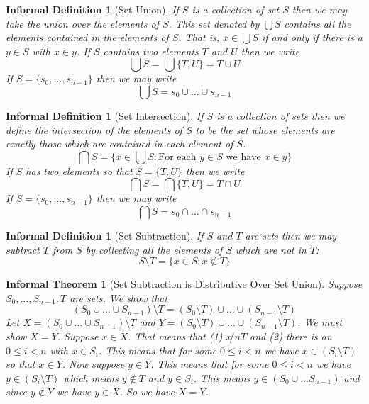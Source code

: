 \documentclass[12pt]{article}
\theoremstyle{break}
\theoremstyle{break}
\theoremstyle{break}
\theoremstyle{break}
\theoremstyle{break}
\newtheorem{informal definition}[definition]{Informal Definition}
\theoremstyle{break}
\newtheorem{informal theorem}[theorem]{Informal Theorem}
\begin{document}
	\begin{informal definition}[Set Union]
		If $S$ is a collection of set $S$ then we may take the union over the elements of $S$.
		This set denoted by $\bigcup S$ contains all the elements contained in the elements of $S$.
		That is, $x \in \bigcup S$ if and only if there is a $y\in S$ with $x\in y$.
		If $S$ contains two elements $T$ and $U$ then we write
		$$
		\bigcup S = \bigcup \{T, U\} = T \cup U
		$$
		If $S = \{s_0, \ldots, s_{n-1}\}$ then we may write
		$$
		\bigcup S = s_0 \cup \ldots \cup s_{n-1}
		$$
	\end{informal definition}
	
	\begin{informal definition}[Set Intersection]
		If $S$ is a collection of sets then we define the intersection of the elements of $S$ to be the set whose elements are exactly those which are contained in each element of $S$.
		$$
		\bigcap S = \{x \in \bigcup S: \text{For each } y \in S \text{ we have } x \in y\}
		$$
		If $S$ has two elements so that $S = \{T, U\}$ then we write
		$$
		\bigcap S = \bigcap \{T, U\} = T \cap U
		$$
		If $S = \{s_0, \ldots, s_{n-1}\}$ then we may write
		$$
		\bigcap S = s_0 \cap \ldots \cap s_{n-1}
		$$
	\end{informal definition}
	
	\begin{informal definition}[Set Subtraction]
		If $S$ and $T$ are sets then we may subtract $T$ from $S$ by collecting all the elements of $S$ which are not in $T$:
		\begin{equation*}
			S\setminus T = \{x \in S: x \not \in T\}
		\end{equation*}
	\end{informal definition}
	
	\begin{informal theorem}[Set Subtraction is Distributive Over Set Union]
		Suppose $S_0, \ldots, S_{n-1}, T$ are sets.
		We show that
		\begin{equation*}
			(S_0 \cup \ldots \cup S_{n-1}) \setminus T = (S_0 \setminus T) \cup \ldots \cup (S_{n-1} \setminus T)
		\end{equation*}
		Let $X = (S_0 \cup \ldots \cup S_{n-1}) \setminus T$ and $Y = (S_0 \setminus T) \cup \ldots \cup (S_{n-1} \setminus T)$.
		We must show $X=Y$.
		Suppose $x \in X$.
		That means that (1) $x\not in T$ and (2) there is an $0 \le i < n$ with $x\in S_i$.
		This means that for some $0 \le i < n$ we have $x\in (S_i \setminus T)$ so that $x\in Y$.
		Now suppose $y\in Y$.
		This means that for some $0 \le i < n$ we have $y\in (S_i \setminus T)$ which means $y \not \in T$ and $y\in S_i$.
		This means $y\in (S_0 \cup \ldots S_{n-1})$ and since $y \not \in Y$ we have $y\in X$.
		So we have $X = Y$.
	\end{informal theorem}
	
\end{document}
